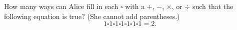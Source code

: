 How many ways can Alice fill in each $\square$ with a $+$, $-$, $\times$, or $\div$ such that the following equation is true? (She cannot add parentheses.) \[1\square 1\square 1\square 1\square 1\square 1\square 1=2.\]
